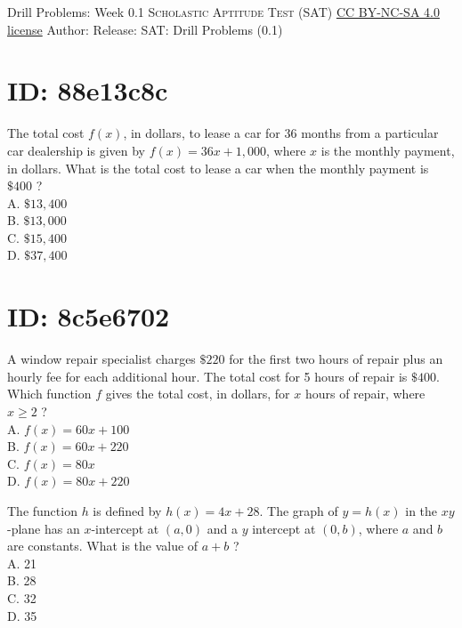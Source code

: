 \newpage\handout
{Drill Problems: Week 0.1}
{\textsc{Scholastic Aptitude Test (SAT)}}
{\href{https://creativecommons.org/licenses/by-nc-sa/4.0/}{CC BY-NC-SA 4.0 license}}
{Author: \BookAuthor}{Release: \generatedOn}
{SAT: Drill Problems (0.1)}








\section*{ID: 88e13c8c}
The total cost $f(x)$, in dollars, to lease a car for 36 months from a particular car dealership is given by $f(x)=36 x+1,000$, where $x$ is the monthly payment, in dollars. What is the total cost to lease a car when the monthly payment is $\$ 400$ ?\\
A. $\$ 13,400$\\
B. $\$ 13,000$\\
C. $\$ 15,400$\\
D. $\$ 37,400$





\section*{ID: 8c5e6702}
A window repair specialist charges $\$ 220$ for the first two hours of repair plus an hourly fee for each additional hour. The total cost for 5 hours of repair is $\$ 400$. Which function $f$ gives the total cost, in dollars, for $x$ hours of repair, where $x \geq 2$ ?\\
A. $f(x)=60 x+100$\\
B. $f(x)=60 x+220$\\
C. $f(x)=80 x$\\
D. $f(x)=80 x+220$






The function $h$ is defined by $h(x)=4 x+28$. The graph of $y=h(x)$ in the $x y$-plane has an $x$-intercept at $(a, 0)$ and a $y$ intercept at $(0, b)$, where $a$ and $b$ are constants. What is the value of $a+b$ ?\\
A. 21\\
B. 28\\
C. 32\\
D. 35






